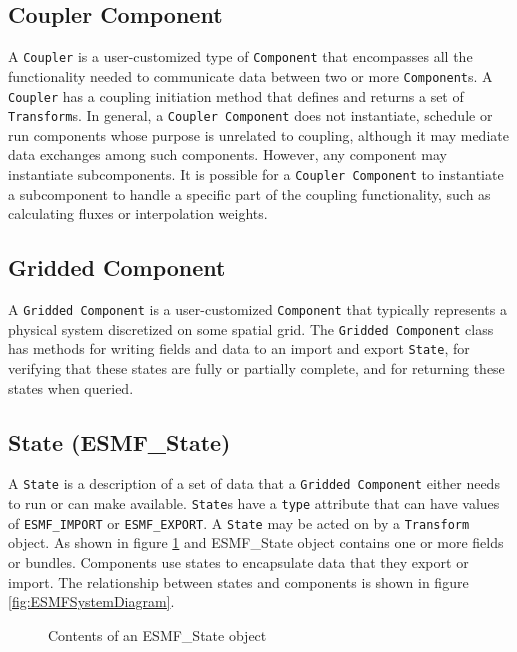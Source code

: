 \subsection{Coupler Component }
A {\tt Coupler} is a user-customized type of {\tt Component} that 
encompasses all the functionality needed to communicate data between two or 
more {\tt Component}s.  A {\tt Coupler} has a coupling initiation method that 
defines and returns a set of {\tt Transform}s. In general, a {\tt Coupler Component} does not instantiate, schedule or run components whose purpose is unrelated 
to coupling, although it may mediate data exchanges among such components.
However, any component may instantiate subcomponents. It is possible
for a {\tt Coupler Component} to instantiate a subcomponent to handle a
specific part of the coupling functionality, such as calculating fluxes
or interpolation weights.


\subsection{Gridded Component }
\label{sec:griddedcomponent} 
A {\tt Gridded Component} is a user-customized {\tt Component} 
that typically represents a physical system discretized on some spatial grid.
The {\tt Gridded Component} class has methods for writing 
fields and data to an import and export {\tt State}, for verifying that
these states are fully or partially complete, and for returning these
states when queried.



\subsection{State (ESMF\_State)}
A {\tt State} is a description of a set of data that a 
{\tt Gridded Component} either needs to run or can make available.  
{\tt State}s
have a {\tt type} attribute that can have values of {\tt ESMF\_IMPORT} or
{\tt ESMF\_EXPORT}.  A {\tt State} may be acted on by a {\tt Transform} object.
As shown in figure \ref{fig:ESMFStateDiagram} and ESMF\_State object contains 
one or more fields or bundles. Components use states to encapsulate 
data that they export or import. The relationship between states and 
components is shown in figure \ref{fig:ESMFSystemDiagram}.

\begin{figure}
\caption[{ESMF State Contents}]{Contents of an ESMF\_State object}
\label{fig:ESMFStateDiagram}
\end{figure}

